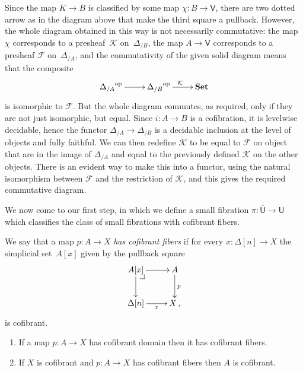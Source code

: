 \documentclass[reqno,10pt,a4paper,oneside]{amsart}
\makeatletter
\renewenvironment{proof}[1][\proofname] {\par\pushQED{\qed}\normalfont\topsep6\p@\@plus6\p@\relax\trivlist\item[\hskip\labelsep\bf#1\@addpunct{.}]\ignorespaces}{\popQED\endtrivlist\@endpefalse}
\numberwithin{equation}{section}
\theoremstyle{mythm}
\theoremstyle{mydef}
\theoremstyle{myrmk}
\newcommand{\pullback}[1]{\save*!/#1-1.2pc/#1:(-1,1)@^{|-}\restore}
\newcommand{\drpullback}{\pullback{dr}}
\newcommand{\co}{\colon}
\newcommand{\op}{\operatorname{op}}
\newcommand{\UU}{\overline{\mathsf{U}}}
\newcommand{\U}{\mathsf{U}}
\newcommand{\V}{\mathsf{V}}
\newcommand{\Set}{\mathbf{Set}}
\makeatother
\begin{document}
\begin{proof}
Since the map $K \to B$ is classified by some map $\chi \co B \to \V$, there are two dotted arrow as in the diagram above that make the third square a pullback. However, the whole diagram obtained in this way
is not necessarily commutative: the map $\chi$ corresponds to a presheaf~$\mathcal{K}$ on~$\Delta_{/B}$, the map $A \to \V$ corresponds to a presheaf $\mathcal{F}$ on~$\Delta_{/A}$, and the 
commutativity of the given solid diagram means that the composite 
\[
\xymatrix{
{\Delta_{/A}}^{\op} \ar[r] & {\Delta_{/B}}^{\op} \ar[r]^{\mathcal{K}} &  \Set} 
\] 
is isomorphic to $\mathcal{F}$. But the whole diagram commutes, as required, only if they are not just isomorphic, but equal. Since $i \co A \to B$ is a cofibration, it is levelwise decidable, hence the functor $\Delta_{/A} \to \Delta_{/B}$ is a decidable inclusion at the level of objects and fully faithful. We can then redefine $\mathcal{K}$ to be equal to $\mathcal{F}$ on object that are in the image of $\Delta_{/A}$ and equal to the previously defined $\mathcal{K}$ on the other objects. There is an evident way to make this into a functor, using the natural isomorphism between $\mathcal{F}$ and the restriction of $\mathcal{K}$, and this gives the required commutative diagram.
\end{proof}

\bigskip

We now come to our first step, in which we define a small fibration $\pi \co \UU \to \U$ which 
classifies the class of small fibrations with cofibrant fibers. 

\begin{definition} We say that a map $p \co A \to X$ \emph{has cofibrant fibers} if for every $x \co \Delta[n] 
\to X$ the simplicial set~$A[x]$ given by the pullback square
\[
\xymatrix{
A[x] \ar[r] \ar[d] \drpullback & A \ar[d]^{p} \\
\Delta[n] \ar[r]_-{x} & X \, , }
\]
is cofibrant.
\end{definition}


\begin{lemma} \label{lem:Cofib_fiber} \hfill 
\begin{enumerate}[$(i)$]
\item If a map $p \co A \rightarrow X$ has cofibrant domain then it has cofibrant fibers.
\item If $X$ is cofibrant and $p \co A \rightarrow X$ has cofibrant fibers then $A$ is cofibrant.
\end{enumerate}
\end{lemma} 
\end{document}
